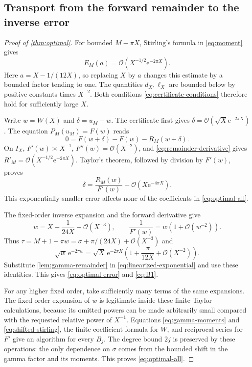 \documentclass[11pt,a4paper]{article}
\theoremstyle{definition}
\numberwithin{equation}{section}
\newcommand{\ee}{\mathrm{e}}
\newcommand{\Oh}{\mathcal O}
\begin{document}
\subsection{Transport from the forward remainder to the inverse error}
\begin{proof}[Proof of \cref{thm:optimal}]
For bounded $M-\pi X$, Stirling's formula in \eqref{eq:moment} gives
\[
 E_M(a)=\Oh(X^{-1/2}\ee^{-2\pi X}).
\]
Here $a=X-1/(12X)$, so replacing $X$ by $a$ changes this estimate by a bounded factor tending to one. The quantities $d_X,\ell_X$ are bounded below by positive constants times $X^{-2}$. Both conditions \eqref{eq:certificate-conditions} therefore hold for sufficiently large $X$.

Write $w=W(X)$ and $\delta=u_M-w$. The certificate first gives
$\delta=\Oh(\sqrt X\ee^{-2\pi X})$. The equation $P_M(u_M)=F(w)$ reads
\[
 0=F(w+\delta)-F(w)-R_M(w+\delta).
\]
On $I_X$, $F'(w)\asymp X^{-1}$, $F''(w)=\Oh(X^{-2})$, and \eqref{eq:remainder-derivative} gives
$R'_M=\Oh(X^{-1/2}\ee^{-2\pi X})$. Taylor's theorem, followed by division by $F'(w)$, proves
\begin{equation}
 \delta=\frac{R_M(w)}{F'(w)}
           +\Oh(X\ee^{-4\pi X}).
 \label{eq:linearized-exponential}
\end{equation}
This exponentially smaller error affects none of the coefficients in \eqref{eq:optimal-all}.

The fixed-order inverse expansion and the forward derivative give
\begin{equation}
 w=X-\frac1{24X}+\Oh(X^{-3}),\qquad
 \frac1{F'(w)}=w\left(1+\Oh(w^{-2})\right).
 \label{eq:center-transport}
\end{equation}
Thus $\tau=M+1-\pi w=\sigma+\pi/(24X)+\Oh(X^{-3})$ and
\[
 \sqrt w\,\ee^{-2\pi w}
 =\sqrt X\,\ee^{-2\pi X}
       \left(1+\frac\pi{12X}+\Oh(X^{-2})\right).
\]
Substitute \cref{lem:gamma-remainder} in \eqref{eq:linearized-exponential} and use these identities. This gives \eqref{eq:optimal-error} and \eqref{eq:B1}.

For any higher fixed order, take sufficiently many terms of the same expansions. The fixed-order expansion of $w$ is legitimate inside these finite Taylor calculations, because its omitted powers can be made arbitrarily small compared with the requested relative power of $X^{-1}$. Equations \eqref{eq:gamma-moments} and \eqref{eq:shifted-stirling}, the finite coefficient formula for $W$, and reciprocal series for $F'$ give an algorithm for every $B_j$. The degree bound $2j$ is preserved by these operations: the only dependence on $\sigma$ comes from the bounded shift in the gamma factor and its moments. This proves \eqref{eq:optimal-all}.
\end{proof}
\end{document}
